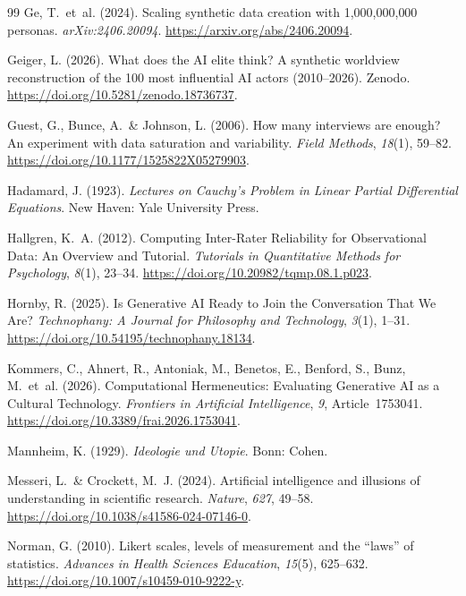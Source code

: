 \documentclass[11pt,a4paper]{article}
\begin{document}
\begin{thebibliography}{99}
  Ge, T.~et~al. (2024).
  Scaling synthetic data creation with 1{,}000{,}000{,}000 personas.
  \textit{arXiv:2406.20094}. \url{https://arxiv.org/abs/2406.20094}.

  Geiger, L. (2026).
  What does the AI elite think? A synthetic worldview reconstruction of the 100 most influential AI actors (2010--2026).
  Zenodo. \url{https://doi.org/10.5281/zenodo.18736737}.

  Guest, G., Bunce, A.~\& Johnson, L. (2006).
  How many interviews are enough? An experiment with data saturation and variability.
  \textit{Field Methods}, \textit{18}(1), 59--82. \url{https://doi.org/10.1177/1525822X05279903}.

  Hadamard, J. (1923).
  \textit{Lectures on Cauchy's Problem in Linear Partial Differential Equations}.
  New Haven: Yale University Press.

  Hallgren, K.~A. (2012).
  Computing Inter-Rater Reliability for Observational Data: An Overview and Tutorial.
  \textit{Tutorials in Quantitative Methods for Psychology}, \textit{8}(1), 23--34. \url{https://doi.org/10.20982/tqmp.08.1.p023}.

  Hornby, R. (2025).
  Is Generative AI Ready to Join the Conversation That We Are?
  \textit{Technophany: A Journal for Philosophy and Technology}, \textit{3}(1), 1--31. \url{https://doi.org/10.54195/technophany.18134}.

  Kommers, C., Ahnert, R., Antoniak, M., Benetos, E., Benford, S., Bunz, M.~et~al. (2026).
  Computational Hermeneutics: Evaluating Generative AI as a Cultural Technology.
  \textit{Frontiers in Artificial Intelligence}, \textit{9}, Article~1753041. \url{https://doi.org/10.3389/frai.2026.1753041}.

  Mannheim, K. (1929).
  \textit{Ideologie und Utopie}.
  Bonn: Cohen.

  Messeri, L.~\& Crockett, M.~J. (2024).
  Artificial intelligence and illusions of understanding in scientific research.
  \textit{Nature}, \textit{627}, 49--58. \url{https://doi.org/10.1038/s41586-024-07146-0}.

  Norman, G. (2010).
  Likert scales, levels of measurement and the ``laws'' of statistics.
  \textit{Advances in Health Sciences Education}, \textit{15}(5), 625--632. \url{https://doi.org/10.1007/s10459-010-9222-y}.


\end{thebibliography}
\end{document}
